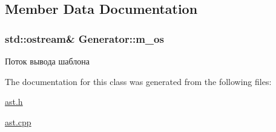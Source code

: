 \subsection{Member Data Documentation}
\hypertarget{classGenerator_a66fe842aa93b878a74c96fb0852d4626}{}
\subsubsection[{m\+\_\+os}]{\setlength{\rightskip}{0pt plus 5cm}std\+::ostream\& Generator\+::m\+\_\+os\hspace{0.3cm}{\ttfamily [protected]}}\label{classGenerator_a66fe842aa93b878a74c96fb0852d4626}


Поток вывода шаблона 



The documentation for this class was generated from the following files\+:\begin{DoxyCompactItemize}
\item 
\hyperlink{ast_8h}{ast.\+h}\item 
\hyperlink{ast_8cpp}{ast.\+cpp}\end{DoxyCompactItemize}
